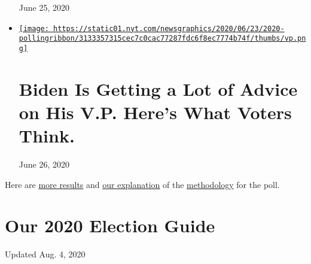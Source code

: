 \begin{itemize}
  June 25, 2020
\item
  \href{https://www.nytimes.com/2020/06/26/us/politics/biden-vice-president-voters.html}{\texttt{[image: https://static01.nyt.com/newsgraphics/2020/06/23/2020-pollingribbon/3133357315cec7c0cac77287fdc6f8ec7774b74f/thumbs/vp.png]}}

  \href{https://www.nytimes.com/2020/06/26/us/politics/biden-vice-president-voters.html}{}

  \hypertarget{biden-is-getting-a-lot-of-advice-on-his-vp-heres-what-voters-think}{%
  \section{Biden Is Getting a Lot of Advice on His V.P. Here's What
  Voters
  Think.}\label{biden-is-getting-a-lot-of-advice-on-his-vp-heres-what-voters-think}}

  June 26, 2020
\end{itemize}

Here are
\href{https://int.nyt.com/data/documenttools/crosstabs0624release/18307fed6cb2dc5a/full.pdf}{more
results} and
\href{https://www.nytimes.com/2020/06/23/upshot/poll-2020-election-method.html}{our
explanation} of the
\href{https://int.nyt.com/data/documenttools/nyt-siena-poll-methodology-june-2020/f6f533b4d07f4cbe/full.pdf}{methodology}
for the poll.

\hypertarget{our-2020-election-guide}{%
\section{Our 2020 Election Guide}\label{our-2020-election-guide}}

Updated Aug. 4, 2020

